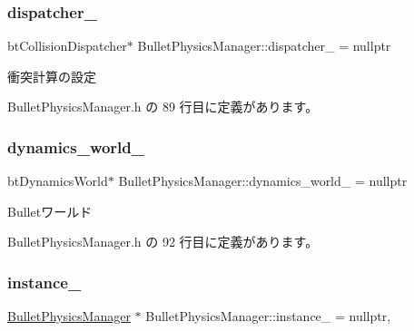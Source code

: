 \subsubsection{\texorpdfstring{dispatcher\+\_\+}{dispatcher\_}}
{\footnotesize\ttfamily bt\+Collision\+Dispatcher$\ast$ Bullet\+Physics\+Manager\+::dispatcher\+\_\+ = nullptr\hspace{0.3cm}{\ttfamily [private]}}



衝突計算の設定 



 Bullet\+Physics\+Manager.\+h の 89 行目に定義があります。

\mbox{\label{class_bullet_physics_manager_acd0e088adad3c0cc032fea67a2bcef10}} 
\subsubsection{\texorpdfstring{dynamics\+\_\+world\+\_\+}{dynamics\_world\_}}
{\footnotesize\ttfamily bt\+Dynamics\+World$\ast$ Bullet\+Physics\+Manager\+::dynamics\+\_\+world\+\_\+ = nullptr\hspace{0.3cm}{\ttfamily [private]}}



Bulletワールド 



 Bullet\+Physics\+Manager.\+h の 92 行目に定義があります。

\mbox{\label{class_bullet_physics_manager_ad26c2767666f071dc1b39fba7138cd20}} 
\subsubsection{\texorpdfstring{instance\+\_\+}{instance\_}}
{\footnotesize\ttfamily \mbox{\hyperlink{class_bullet_physics_manager}{Bullet\+Physics\+Manager}} $\ast$ Bullet\+Physics\+Manager\+::instance\+\_\+ = nullptr\hspace{0.3cm}{\ttfamily [static]}, {\ttfamily [private]}}



